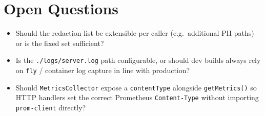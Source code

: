 \section{Open Questions}
\begin{itemize}[leftmargin=1.2em]
  \item Should the redaction list be extensible per caller (e.g.\ additional PII paths) or is the fixed set sufficient?
  \item Is the \texttt{./logs/server.log} path configurable, or should dev builds always rely on \texttt{fly} / container log capture in line with production?
  \item Should \texttt{MetricsCollector} expose a \texttt{contentType} alongside \texttt{getMetrics()} so HTTP handlers set the correct Prometheus \texttt{Content-Type} without importing \texttt{prom-client} directly?
\end{itemize}


